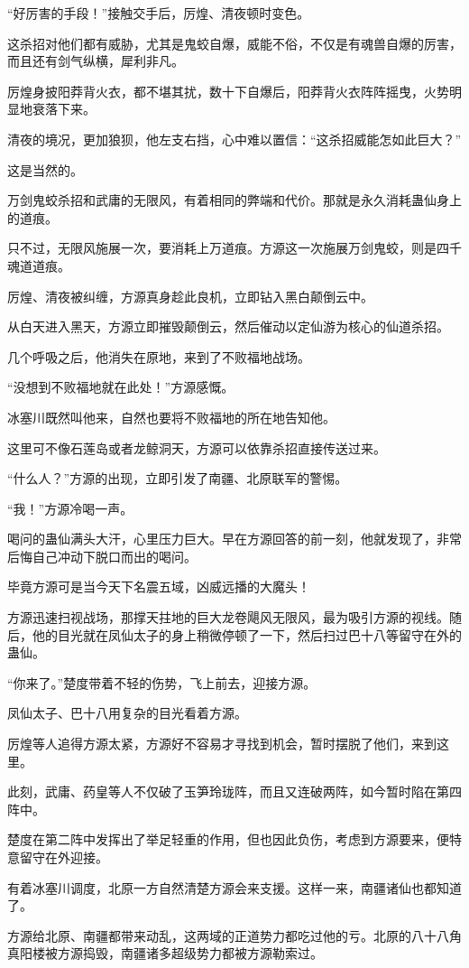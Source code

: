 \begin{this_body}
“好厉害的手段！”接触交手后，厉煌、清夜顿时变色。

这杀招对他们都有威胁，尤其是鬼蛟自爆，威能不俗，不仅是有魂兽自爆的厉害，而且还有剑气纵横，犀利非凡。

厉煌身披阳莽背火衣，都不堪其扰，数十下自爆后，阳莽背火衣阵阵摇曳，火势明显地衰落下来。

清夜的境况，更加狼狈，他左支右挡，心中难以置信：“这杀招威能怎如此巨大？”

这是当然的。

万剑鬼蛟杀招和武庸的无限风，有着相同的弊端和代价。那就是永久消耗蛊仙身上的道痕。

只不过，无限风施展一次，要消耗上万道痕。方源这一次施展万剑鬼蛟，则是四千魂道道痕。

厉煌、清夜被纠缠，方源真身趁此良机，立即钻入黑白颠倒云中。

从白天进入黑天，方源立即摧毁颠倒云，然后催动以定仙游为核心的仙道杀招。

几个呼吸之后，他消失在原地，来到了不败福地战场。

“没想到不败福地就在此处！”方源感慨。

冰塞川既然叫他来，自然也要将不败福地的所在地告知他。

这里可不像石莲岛或者龙鲸洞天，方源可以依靠杀招直接传送过来。

“什么人？”方源的出现，立即引发了南疆、北原联军的警惕。

“我！”方源冷喝一声。

喝问的蛊仙满头大汗，心里压力巨大。早在方源回答的前一刻，他就发现了，非常后悔自己冲动下脱口而出的喝问。

毕竟方源可是当今天下名震五域，凶威远播的大魔头！

方源迅速扫视战场，那撑天拄地的巨大龙卷飓风无限风，最为吸引方源的视线。随后，他的目光就在凤仙太子的身上稍微停顿了一下，然后扫过巴十八等留守在外的蛊仙。

“你来了。”楚度带着不轻的伤势，飞上前去，迎接方源。

凤仙太子、巴十八用复杂的目光看着方源。

厉煌等人追得方源太紧，方源好不容易才寻找到机会，暂时摆脱了他们，来到这里。

此刻，武庸、药皇等人不仅破了玉笋玲珑阵，而且又连破两阵，如今暂时陷在第四阵中。

楚度在第二阵中发挥出了举足轻重的作用，但也因此负伤，考虑到方源要来，便特意留守在外迎接。

有着冰塞川调度，北原一方自然清楚方源会来支援。这样一来，南疆诸仙也都知道了。

方源给北原、南疆都带来动乱，这两域的正道势力都吃过他的亏。北原的八十八角真阳楼被方源捣毁，南疆诸多超级势力都被方源勒索过。


\end{this_body}
